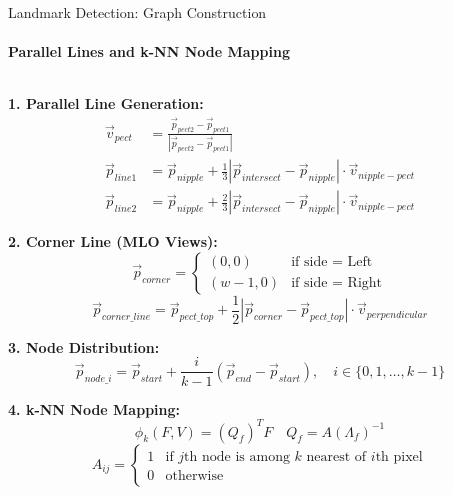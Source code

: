 \documentclass[8pt,aspectratio=169,xcolor=dvipsnames]{beamer}
\begin{document}
\begin{frame}{Landmark Detection: Graph Construction}
    \framesubtitle{Parallel Lines and k-NN Node Mapping}
    
    \begin{columns}
        \begin{column}{0.58\textwidth}
            \tiny
            \textbf{1. Parallel Line Generation:}
            \begin{equation}
            \begin{aligned}
            \vec{v}_{pect} &= \frac{\vec{p}_{pect2} - \vec{p}_{pect1}}{|\vec{p}_{pect2} - \vec{p}_{pect1}|} \\
            \vec{p}_{line1} &= \vec{p}_{nipple} + \frac{1}{3}|\vec{p}_{intersect} - \vec{p}_{nipple}| \cdot \vec{v}_{nipple-pect} \\
            \vec{p}_{line2} &= \vec{p}_{nipple} + \frac{2}{3}|\vec{p}_{intersect} - \vec{p}_{nipple}| \cdot \vec{v}_{nipple-pect}
            \end{aligned}
            \end{equation}
            
            \textbf{2. Corner Line (MLO Views):}
            \begin{equation}
            \vec{p}_{corner} = \begin{cases}
                (0, 0) & \text{if side = Left} \\
                (w-1, 0) & \text{if side = Right}
            \end{cases}
            \end{equation}
            \begin{equation}
            \vec{p}_{corner\_line} = \vec{p}_{pect\_top} + \frac{1}{2}|\vec{p}_{corner} - \vec{p}_{pect\_top}| \cdot \vec{v}_{perpendicular}
            \end{equation}
            
            \textbf{3. Node Distribution:}
            \begin{equation}
            \vec{p}_{node\_i} = \vec{p}_{start} + \frac{i}{k-1}(\vec{p}_{end} - \vec{p}_{start}), \quad i \in \{0, 1, \ldots, k-1\}
            \end{equation}
            
            \textbf{4. k-NN Node Mapping:}
            \begin{equation}
            \phi_k(F, V) = (Q_f)^T F \quad Q_f = A(\Lambda_f)^{-1}
            \end{equation}
            \begin{equation}
            A_{ij} = \begin{cases}
                1 & \text{if $j$th node is among $k$ nearest of $i$th pixel} \\
                0 & \text{otherwise}
            \end{cases}
            \end{equation}
        \end{column}
        

\end{columns}
\end{frame}
\end{document}
